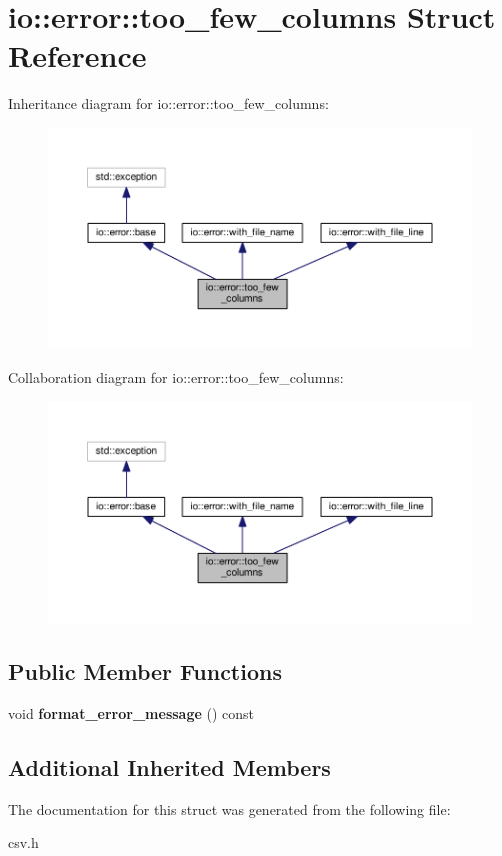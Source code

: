 \section{io\+:\+:error\+:\+:too\+\_\+few\+\_\+columns Struct Reference}
\label{structio_1_1error_1_1too__few__columns}


Inheritance diagram for io\+:\+:error\+:\+:too\+\_\+few\+\_\+columns\+:\nopagebreak
\begin{figure}[H]
\begin{center}
\leavevmode
\includegraphics[width=350pt]{structio_1_1error_1_1too__few__columns__inherit__graph}
\end{center}
\end{figure}


Collaboration diagram for io\+:\+:error\+:\+:too\+\_\+few\+\_\+columns\+:\nopagebreak
\begin{figure}[H]
\begin{center}
\leavevmode
\includegraphics[width=350pt]{structio_1_1error_1_1too__few__columns__coll__graph}
\end{center}
\end{figure}
\subsection*{Public Member Functions}
\begin{DoxyCompactItemize}
\item 
void {\bfseries format\+\_\+error\+\_\+message} () const \label{structio_1_1error_1_1too__few__columns_a208e2be6855a6bfd1f3792be146dd84f}

\end{DoxyCompactItemize}
\subsection*{Additional Inherited Members}


The documentation for this struct was generated from the following file\+:\begin{DoxyCompactItemize}
\item 
csv.\+h\end{DoxyCompactItemize}

